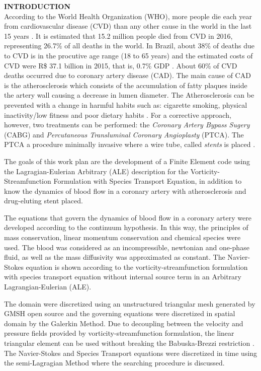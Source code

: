 \noindent\textbf{INTRODUCTION}
\\

According to the World Health Organization (WHO), more people die each year from cardiovascular disease (CVD) than any other cause in the world in the last 15 years \cite{oms2018}.
It is estimated that 15.2 million people died from CVD in 2016,
representing 26.7\% of all deaths in the world. 
In Brazil, about 38\% of deaths due to CVD is in the procutive age range
(18 to 65 years) and the estimated
costs of CVD were R\$ 37.1 billion
in 2015, that is, 0.7\% GDP \cite{siqueira2017}.
About 60\% of CVD deaths
occurred due to coronary artery disease (CAD).
The main cause of CAD is the atherosclerosis which consists of
the accumulation of fatty plaques inside the artery wall causing
a decrease in lumen diameter.
The Atherosclerosis can be prevented with a change in harmful habits
such as: cigarette smoking, physical inactivity/low fitness and poor dietary habits \cite{spring2013}.
For a corrective approach, however, two treatments can be performed:
the \textit{Coronary Artery Bypass Sugery} (CABG) and
\textit{Percutaneous Transluminal Coronary Angioplasty} (PTCA).
The PTCA a procedure minimally invasive where a wire tube,
called \textit{stents} is placed \cite{sigwart1987}.

\medskip
The goals of this work plan are the development of a
Finite Element code using the Lagragian-Eulerian Arbitrary (ALE) 
description for the Vorticity-Streamfunction Formulation 
with Species Transport Equation, 
in addition to know the dynamics of blood flow in a 
coronary artery with atherosclerosis and drug-eluting stent placed.

\medskip
The equations that govern the dynamics of blood flow in a coronary artery were developed according to the continuum hypothesis.
In this way, the principles of mass conservation, linear momentum conservation and chemical species were used.
The blood was considered as an incompressible, newtonian and one-phase 
fluid, as well as the mass diffusivity was approximated as constant.
The Navier-Stokes equation is shown according to the 
vorticity-streamfunction formulation with species transport 
equation without internal source term in an 
Arbitrary Lagrangian-Eulerian (ALE).

\medskip
The domain were discretized using an unstructured triangular 
mesh generated by GMSH open source \cite{gmsh} and 
the governing equations were discretized in spatial domain 
by the Galerkin Method. 
Due to decoupling between the velocity and pressure fields 
provided by vorticity-streamfunction formulation, the linear 
triangular element can be used without breaking the 
Babuska-Brezzi restriction \cite{babuska1971}\cite{brezzi1974}.
The Navier-Stokes and Species Transport equations were 
discretized in time using the semi-Lagragian Method 
\cite{pironneau1982} where the searching procedure is
discussed.

